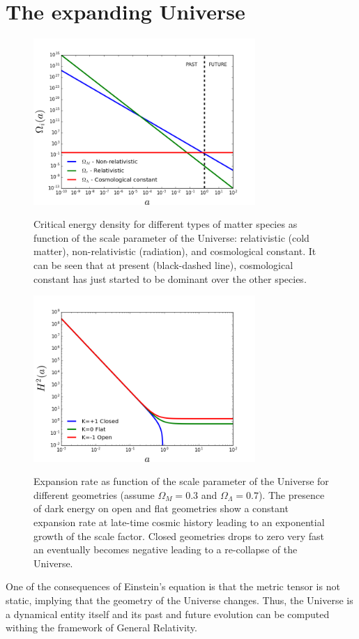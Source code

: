 \section{The expanding Universe}
\begin{figure}
\begin{center}
\includegraphics[width=0.75\textwidth]{./Pictures/rho_a.png}
\caption{Critical energy density for different types of matter species as function of the scale parameter of the Universe: relativistic (cold matter), non-relativistic (radiation), and cosmological constant. It can be seen that at present (black-dashed line), cosmological constant has just started to be dominant over the other species.}
\label{fig:rho_de}
\includegraphics[width=0.75\textwidth]{./Pictures/scale_factor.png}
\caption{Expansion rate as function of the scale parameter of the Universe for different geometries (assume $\Omega_M=0.3$ and $\Omega_\Lambda=0.7$). The presence of dark energy on open and flat geometries show a constant expansion rate at late-time cosmic history leading to an exponential growth of the scale factor. Closed geometries drops to zero very fast an eventually becomes negative leading to a re-collapse of the Universe.}
\label{fig:scale_geometry}
\end{center}
\end{figure}
One of the consequences of Einstein's equation is that the metric tensor is not static, implying that the geometry of the Universe changes. Thus, the Universe is a dynamical entity itself and its past and future evolution can be computed withing the framework of General Relativity.
\newline

